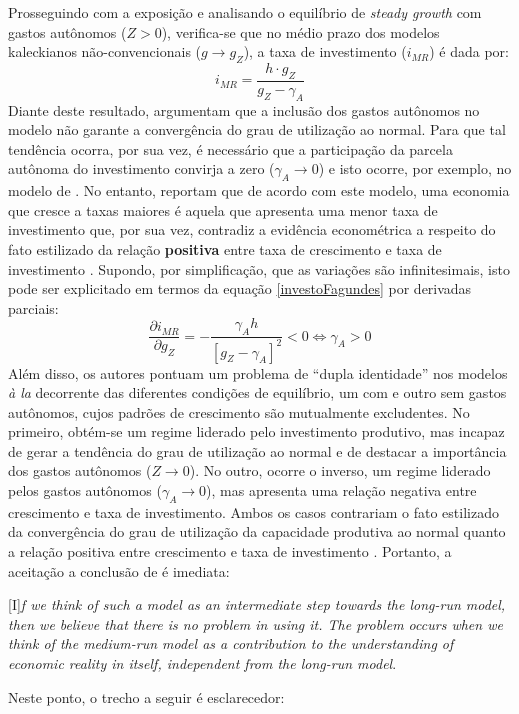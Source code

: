 Prosseguindo com a exposição e analisando o equilíbrio de \textit{steady growth} com gastos autônomos ($Z > 0$), verifica-se que no médio prazo dos modelos kaleckianos não-convencionais ($g\to g_Z$), a taxa de investimento ($i_{MR}$) é dada por:
\begin{equation}
\label{investoFagundes}
i_{MR} = \frac{h\cdot g_Z}{g_Z - \gamma_A}
\end{equation}
Diante deste resultado, \textcite{fagundes_role_2017} argumentam que a inclusão dos gastos autônomos no modelo não garante a convergência do grau de utilização ao normal. Para que tal tendência ocorra, por sua vez, é necessário que a participação da parcela autônoma do investimento convirja a zero ($\gamma_A \to 0$) e isto ocorre, por exemplo, no modelo de  \textcite{lavoie_convergence_2016}. 
No entanto, \textcite{fagundes_role_2017} reportam que de acordo com este modelo, uma economia que cresce a taxas maiores é aquela que apresenta uma menor taxa de investimento que, por sua vez, contradiz a evidência econométrica a respeito do fato estilizado da relação \textbf{positiva} entre taxa de crescimento e  taxa de investimento \cites{braga_investment_2018}{haluska_growth_2019}. Supondo, por simplificação, que as variações são infinitesimais, isto pode ser explicitado em termos da equação \ref{investoFagundes} por derivadas parciais:
$$
\frac{\partial i_{MR}}{\partial g_Z} = - \frac{\gamma_A h}{[g_Z - \gamma_A]^2} < 0 \Leftrightarrow \gamma_A > 0
$$
Além disso, os autores pontuam um problema de ``dupla identidade'' nos modelos \textit{à la} \textcite{allain_tackling_2015} decorrente das diferentes condições de equilíbrio, um com e outro sem gastos autônomos, cujos padrões de crescimento são mutualmente excludentes. No primeiro, obtém-se um regime liderado pelo investimento produtivo, mas incapaz de gerar a tendência do grau de utilização ao normal e de destacar a importância dos gastos autônomos ($Z\to 0$). No outro, ocorre o inverso, um regime liderado pelos gastos autônomos ($\gamma_A \to 0$), mas apresenta uma relação negativa entre crescimento e taxa de investimento. Ambos os casos contrariam
o fato estilizado da convergência do grau de utilização da capacidade produtiva ao normal \cite{gahn_empirical_2019} quanto a relação positiva entre crescimento e taxa de investimento \cites{braga_investment_2018}{haluska_growth_2019}. Portanto, a aceitação a conclusão de \textcite[p.~13]{fagundes_role_2017} é imediata:

\begin{citacao}
	
	[I]\textit{f we think of such a model as an intermediate step towards the long-run model, then we
	believe that there is no problem in using it. The problem occurs when we think of the medium-run
	model as a contribution to the understanding of economic reality in itself, independent from the long-run model}.
\end{citacao}
Neste ponto, o trecho a seguir é esclarecedor:

